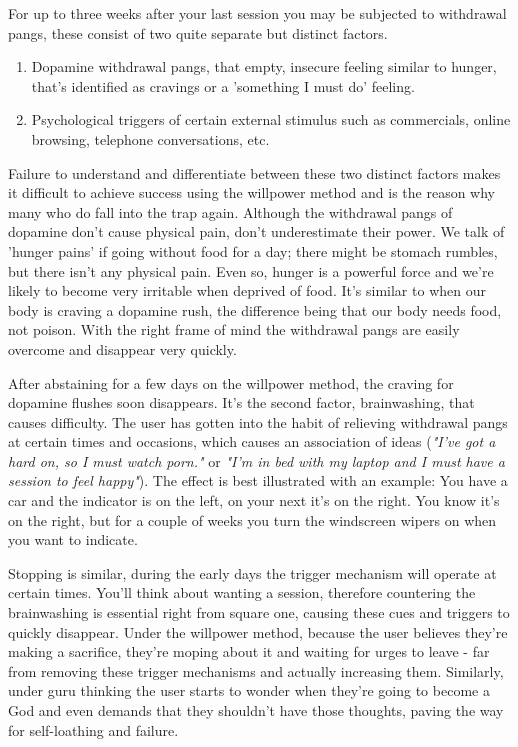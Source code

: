 \documentclass[easypeasy.tex]{subfiles}
\begin{document}
For up to three weeks after your last session you may be subjected to withdrawal pangs, these consist of two quite separate but distinct factors.
\begin{enumerate}
  \item Dopamine withdrawal pangs, that empty, insecure feeling similar to hunger, that's identified as cravings or a 'something I must do' feeling.

  \item Psychological triggers of certain external stimulus such as commercials, online browsing, telephone conversations, etc.
\end{enumerate}

Failure to understand and differentiate between these two distinct factors makes it difficult to achieve success using the willpower method and is the reason why many who do fall into the trap again. Although the withdrawal pangs of dopamine don't cause physical pain, don't underestimate their power. We talk of 'hunger pains' if going without food for a day; there might be stomach rumbles, but there isn't any physical pain. Even so, hunger is a powerful force and we're likely to become very irritable when deprived of food. It's similar to when our body is craving a dopamine rush, the difference being that our body needs food, not poison. With the right frame of mind the withdrawal pangs are easily overcome and disappear very quickly.

After abstaining for a few days on the willpower method, the craving for dopamine flushes soon disappears. It's the second factor, brainwashing, that causes difficulty. The user has gotten into the habit of relieving withdrawal pangs at certain times and occasions, which causes an association of ideas (\textit{"I've got a hard on, so I must watch porn."} or \textit{"I'm in bed with my laptop and I must have a session to feel happy"}). The effect is best illustrated with an example: You have a car and the indicator is on the left, on your next it's on the right. You know it's on the right, but for a couple of weeks you turn the windscreen wipers on when you want to indicate.

Stopping is similar, during the early days the trigger mechanism will operate at certain times. You'll think about wanting a session, therefore countering the brainwashing is essential right from square one, causing these cues and triggers to quickly disappear. Under the willpower method, because the user believes they're making a sacrifice, they're moping about it and waiting for urges to leave - far from removing these trigger mechanisms and actually increasing them. Similarly, under guru thinking the user starts to wonder when they're going to become a God and even demands that they shouldn't have those thoughts, paving the way for self-loathing and failure.
\end{document}
